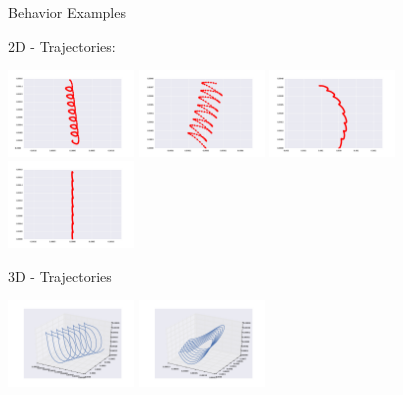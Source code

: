 \documentclass{beamer}
\begin{document}
\begin{frame}[allowframebreaks]{Behavior Examples}

\begin{minipage}{\textwidth}
\begin{block}{2D - Trajectories:}
\begin{center}
\includegraphics[width=0.25\textwidth]{figures/behaviors/00.pdf}
\includegraphics[width=0.25\textwidth]{figures/behaviors/01.pdf}
\includegraphics[width=0.25\textwidth]{figures/behaviors/02.pdf}
\includegraphics[width=0.25\textwidth]{figures/behaviors/03.pdf}
\end{center}
\end{block}
\begin{block}{3D - Trajectories}
\begin{center}
\includegraphics[width=0.25\textwidth]{figures/behaviors/10.pdf}
\includegraphics[width=0.25\textwidth]{figures/behaviors/11.pdf}

\end{center}
\end{block}
\end{minipage}
\end{frame}
\end{document}
